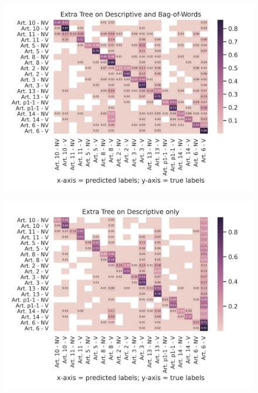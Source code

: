 \documentclass{article}
\begin{document}
\begin{figure}[!htb]
    \centering
    \includegraphics[scale=0.7]{data/analysis/cm/multiclass_cm_test_extra_tree_descriptive_and_bag-of-words.png}  
\end{figure}
\begin{figure}[!htb]
    \centering
    \includegraphics[scale=0.7]{data/analysis/cm/multiclass_cm_test_extra_tree_descriptive_only.png}  
\end{figure}
\end{document}
